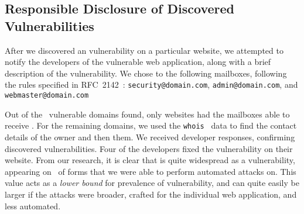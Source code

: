 \subsection{Responsible Disclosure of Discovered Vulnerabilities}
After we discovered an \ehi vulnerability on a particular website, we attempted to notify the developers of the vulnerable web application, along with a brief description of the vulnerability.
We chose to \email the following mailboxes, following the rules
specified in RFC~2142~\cite{rfc2142}: \texttt{security@domain.com},
\texttt{admin@domain.com}, and \texttt{webmaster@domain.com}
 
Out of the \domains\ vulnerable domains found, only
\emailedDefaultmailbox websites had the mailboxes able to receive
\emails. For the remaining domains, we used the
\texttt{whois}~\cite{whois} data to find the contact details of the
owner and then \emailed them. We received \responses developer
responses, confirming \confirmed discovered vulnerabilities. Four of
the developers fixed the vulnerability on their website.
From our research, it is clear that \ehi is quite widespread as a
vulnerability, appearing on \successDelta\ of forms that we were able
to perform automated attacks on. This value acts as a \emph{lower
  bound} for prevalence of \ehi vulnerability, and can quite easily be
larger if the attacks were broader, crafted for the individual web
application, and less automated.



